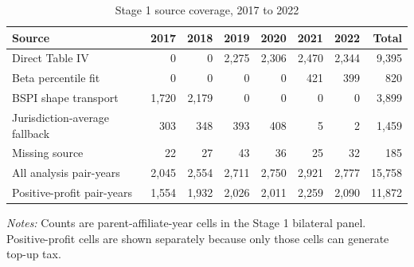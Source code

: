 \begin{table}[H]
\centering
\small
\caption[Stage 1 source coverage]{Stage 1 source coverage, 2017 to 2022}
\label{tab:stage1_source_updated}
\begin{tabular}{@{}lrrrrrrr@{}}
\toprule
Source & 2017 & 2018 & 2019 & 2020 & 2021 & 2022 & Total \\
\midrule
Direct Table IV &     0 &     0 & 2,275 & 2,306 & 2,470 & 2,344 & 9,395 \\
Beta percentile fit &     0 &     0 &     0 &     0 &   421 &   399 &   820 \\
BSPI shape transport & 1,720 & 2,179 &     0 &     0 &     0 &     0 & 3,899 \\
Jurisdiction-average fallback &   303 &   348 &   393 &   408 &     5 &     2 & 1,459 \\
Missing source &    22 &    27 &    43 &    36 &    25 &    32 &   185 \\
All analysis pair-years & 2,045 & 2,554 & 2,711 & 2,750 & 2,921 & 2,777 & 15,758 \\
Positive-profit pair-years & 1,554 & 1,932 & 2,026 & 2,011 & 2,259 & 2,090 & 11,872 \\
\bottomrule
\end{tabular}

\vspace{0.5em}
\begin{minipage}{0.96\textwidth}
\footnotesize\raggedright \textit{Notes:} Counts are parent-affiliate-year cells in the Stage 1 bilateral panel. Positive-profit cells are shown separately because only those cells can generate top-up tax.
\end{minipage}
\end{table}
